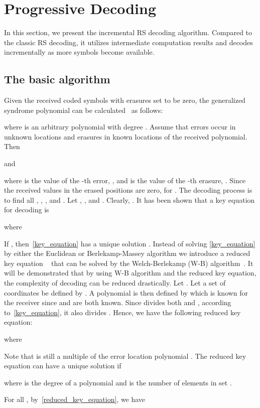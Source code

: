 \documentclass[10pt,journal,letterpaper,compsoc]{IEEEtran}
\newcommand{\0}{{\bf 0}}
\begin{document}
\section{Progressive Decoding}
\label{sect:algo}
In this section, we present the incremental RS decoding algorithm. Compared to
the classic RS decoding, it utilizes intermediate computation results and
decodes incrementally as more symbols become available. 
\subsection{The basic algorithm}
Given the received coded symbols  with erasures
set to be zero, the generalized syndrome polynomial  can be
calculated~\cite{ARA92} as follows:

where  is an arbitrary polynomial with degree . Assume that  errors occur in unknown locations
 and  erasures in known locations  of the received polynomial. Then

and

where  is the value of the -th error, , and  is the value of the -th erasure, . Since the received values in the erased positions are zero,  for . The decoding
process is to find all , , , and . Let , , and . Clearly, .
It has been shown that a key equation for decoding is

where

If , then~\eqref{key_equation} has a unique solution . Instead of solving \eqref{key_equation} by either the Euclidean or Berlekamp-Massey algorithm we introduce a
reduced key equation ~\cite{ARA92} that can be solved by the Welch-Berlekamp
(W-B) algorithm~\cite{MOO05}. It will be demonstrated that by using W-B
algorithm and the reduced key equation, the complexity of decoding can be reduced drastically. Let .  Let a set of
coordinates  be defined by . A polynomial  is then defined by
 which is known for the
receiver since  and  are both known. Since 
divides both  and , according to~\eqref{key_equation}, it
also divides . Hence, we have the following reduced key equation:

where

Note that  is still a multiple of the error location polynomial . The reduced key equation can have a unique solution if

where  is the degree of a polynomial and  is the number of elements in set .

For all , by~\eqref{reduced_key_equation}, we have
\end{document}
